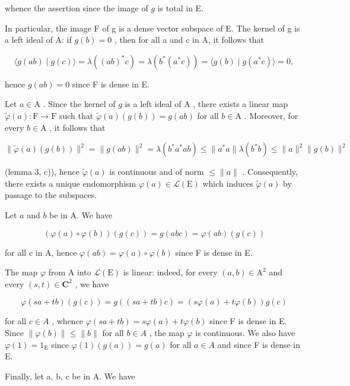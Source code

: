 whence the assertion since the image of \(g\) is total in E.

In particular, the image F of g is a dense vector subspace of E. The kernel of g is a left ideal of A: if \(g(b) = 0\) , then for all a and c in A, it follows that

\[
\langle g (a b) \mid g (c) \rangle = \lambda ((a b) ^ {*} c) = \lambda (b ^ {*} (a ^ {*} c)) = \langle g (b) \mid g (a ^ {*} c) \rangle = 0,
\]

hence \(g(ab) = 0\) since F is dense in E.

Let \(a \in \mathrm{A}\) . Since the kernel of \(g\) is a left ideal of \(\mathrm{A}\) , there exists a linear map \(\widetilde{\varphi}(a) \colon \mathrm{F} \to \mathrm{F}\) such that \(\widetilde{\varphi}(a)(g(b)) = g(ab)\) for all \(b \in \mathrm{A}\) . Moreover, for every \(b \in \mathrm{A}\) , it follows that

\[
\| \widetilde {\varphi} (a) (g (b)) \| ^ {2} = \| g (a b) \| ^ {2} = \lambda \left(b ^ {*} a ^ {*} a b\right) \leqslant \| a ^ {*} a \| \lambda \left(b ^ {*} b\right) \leqslant \| a \| ^ {2} \| g (b) \| ^ {2}
\]

(lemma 3, c)), hence \(\widetilde{\varphi}(a)\) is continuous and of norm \(\leqslant \|a\|\) . Consequently, there exists a unique endomorphism \(\varphi(a) \in \mathcal{L}(\mathrm{E})\) which induces \(\widetilde{\varphi}(a)\) by passage to the subspaces.

Let \(a\) and \(b\) be in A. We have

\[
(\varphi (a) \circ \varphi (b)) (g (c)) = g (a b c) = \varphi (a b) (g (c))
\]

for all c in A, hence \(\varphi(ab) = \varphi(a) \circ \varphi(b)\) since F is dense in E.

The map \(\varphi\) from A into \(\mathcal{L}(\mathrm{E})\) is linear: indeed, for every \((a,b)\in\mathrm{A}^{2}\) and every \((s,t)\in\mathbf{C}^{2}\) , we have

\[
\varphi (s a + t b) (g (c)) = g ((s a + t b) c) = (s \varphi (a) + t \varphi (b)) g (c)
\]

for all \(c \in A\) , whence \(\varphi(sa + tb) = s\varphi(a) + t\varphi(b)\) since F is dense in E. Since \(\|\varphi(b)\| \leqslant \|b\|\) for all \(b \in A\) , the map \(\varphi\) is continuous. We also have \(\varphi(1) = 1_{\mathrm{E}}\) since \(\varphi(1)(g(a)) = g(a)\) for all \(a \in A\) and since F is dense in E.

Finally, let a, b, c be in A. We have

